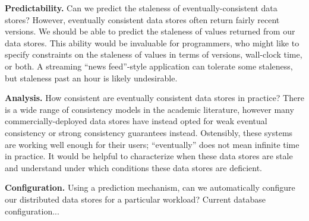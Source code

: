 \documentclass{vldb}
\begin{document}
\textbf{Predictability.} Can we predict the staleness of
eventually-consistent data stores? However, eventually consistent data
stores often return fairly recent versions.  We should be able to
predict the staleness of values returned from our data stores.  This
ability would be invaluable for programmers, who might like to specify
constraints on the staleness of values in terms of versions,
wall-clock time, or both.  A streaming ``news feed''-style application
can tolerate some staleness, but staleness past an hour is likely
undesirable.

\textbf{Analysis.} How consistent are eventually consistent data
stores in practice?  There is a wide range of consistency models in
the academic literature, however many commercially-deployed data
stores have instead opted for weak eventual consistency or strong
consistency guarantees instead.  Ostensibly, these systems are working
well enough for their users; ``eventually'' does not mean infinite
time in practice.  It would be helpful to characterize when these data
stores are stale and understand under which conditions these data
stores are deficient.

\textbf{Configuration.} Using a prediction mechanism, can we
automatically configure our distributed data stores for a particular
workload?  Current database configuration...
\end{document}
